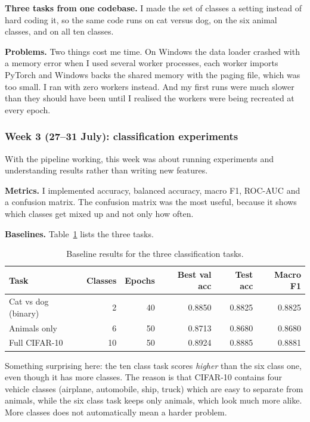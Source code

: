 \documentclass[11pt,a4paper]{article}
\begin{document}
\textbf{Three tasks from one codebase.} I made the set of classes a setting
instead of hard coding it, so the same code runs on cat versus dog, on the six
animal classes, and on all ten classes.

\textbf{Problems.} Two things cost me time. On Windows the data loader crashed
with a memory error when I used several worker processes, each worker
imports PyTorch and Windows backs the shared memory with the paging file,
which was too small. I ran with zero workers instead. And my first runs were much
slower than they should have been until I realised the workers were being
recreated at every epoch.

\subsubsection*{Week 3 (27--31 July): classification experiments}

With the pipeline working, this week was about running experiments and
understanding results rather than writing new features.

\textbf{Metrics.} I implemented accuracy, balanced accuracy, macro F1, ROC-AUC
and a confusion matrix. The confusion matrix was the most useful, because it
shows which classes get mixed up and not only how often.

\textbf{Baselines.} Table~\ref{tab:cls_baselines} lists the three tasks.

\begin{table}[H]
\centering
\small
\begin{tabular}{lrrrrr}
\toprule
\textbf{Task} & \textbf{Classes} & \textbf{Epochs} & \textbf{Best val acc}
& \textbf{Test acc} & \textbf{Macro F1} \\
\midrule
Cat vs dog (binary) & 2  & 40 & 0.8850 & 0.8825 & 0.8825 \\
Animals only        & 6  & 50 & 0.8713 & 0.8680 & 0.8680 \\
Full CIFAR-10       & 10 & 50 & 0.8924 & 0.8885 & 0.8881 \\
\bottomrule
\end{tabular}
\caption{Baseline results for the three classification tasks.}
\label{tab:cls_baselines}
\end{table}

Something surprising here: the ten class task scores \emph{higher} than the
six class one, even though it has more classes. The reason is that CIFAR-10
contains four vehicle classes (airplane, automobile, ship, truck) which are easy
to separate from animals, while the six class task keeps only animals, which look
much more alike. More classes does not automatically mean a harder problem.
\end{document}
